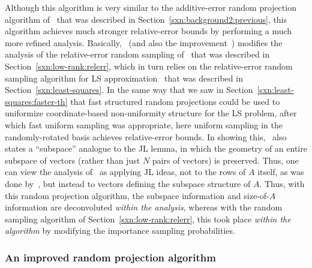 \documentclass[twoside]{article}
\begin{document}
Although this algorithm is very similar to the additive-error random 
projection algorithm of~\cite{PRTV00} that was described in 
Section~\ref{sxn:background2:previous}, this algorithm achieves much 
stronger relative-error bounds by performing a much more refined analysis.
Basically,~\cite{Sarlos06} (and also the improvement~\cite{NDT09}) modifies 
the analysis of the relative-error random sampling 
of~\cite{DMM08_CURtheory_JRNL,CUR_PNAS} that was described in 
Section~\ref{sxn:low-rank:relerr}, which in turn relies on the 
relative-error random sampling algorithm for LS 
approximation~\cite{DMM06,DMM08_CURtheory_JRNL} that was described in 
Section~\ref{sxn:least-squares}.
In the same way that we saw in Section~\ref{sxn:least-squares:faster-th} that
fast structured random projections could be used to uniformize 
coordinate-based non-uniformity structure for the LS problem, after which 
fast uniform sampling was appropriate, here uniform sampling in the 
randomly-rotated basis achieves relative-error bounds.
In showing this,~\cite{Sarlos06} also states a ``subspace'' analogue to the 
JL lemma, in which the geometry of an entire subspace of vectors (rather 
than just $N$ pairs of vectors) is preserved.
Thus, one can view the analysis of~\cite{Sarlos06} as applying JL ideas, 
not to the rows of $A$ itself, as was done by~\cite{PRTV00}, but instead
to vectors defining the subspace structure of $A$.
Thus, with this random projection algorithm, the subspace information and 
size-of-$A$ information are deconvoluted \emph{within the analysis}, whereas 
with the random sampling algorithm of Section~\ref{sxn:low-rank:relerr}, 
this took place \emph{within the algorithm} by modifying the importance 
sampling probabilities.

\subsubsection{An improved random projection algorithm}
\label{sxn:low-rank:proj-second}
\end{document}
